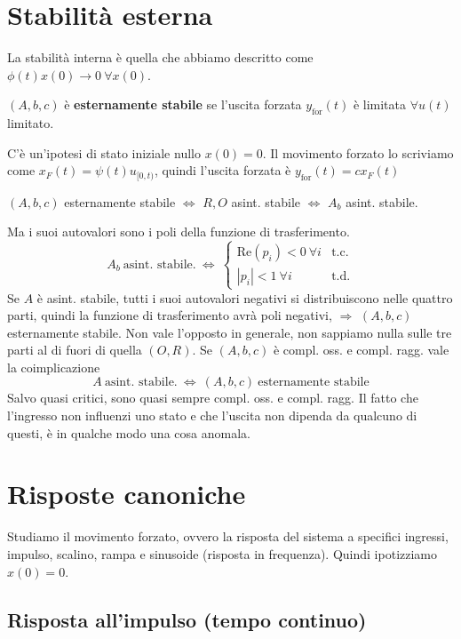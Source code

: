 \documentclass[10pt,a4paper]{book}
\begin{document}
\chapter{Stabilità esterna}

La stabilità interna è quella che abbiamo descritto come $\phi (t) x(0)\rightarrow 0\ \forall x(0)$.
\begin{definition}
$( A,b,c)$ è \textbf{esternamente stabile} se l'uscita forzata $y_{\text{for}}(t)$ è limitata $\forall u(t)$ limitato.
\end{definition}
C'è un'ipotesi di stato iniziale nullo $x(0) =0$. Il movimento forzato lo scriviamo come $x_F(t) =\psi (t) u_{[ 0,t)}$, quindi l'uscita forzata è $y_{\text{for}}(t) =cx_F(t)$
\begin{theorem}
$( A,b,c)$ esternamente stabile $\Leftrightarrow $ $R,O$ asint. stabile $\Leftrightarrow $ $A_b$ asint. stabile.
\end{theorem}
Ma i suoi autovalori sono i poli della funzione di trasferimento.
\begin{equation*}
A_b \ \text{asint. stabile.} \ \Leftrightarrow \ \begin{cases}
\mathrm{Re}( p_i) < 0\ \forall i & \text{t.c.}\\
| p_i| < 1\ \forall i & \text{t.d.}
\end{cases}
\end{equation*}
Se $A$ è asint. stabile, tutti i suoi autovalori negativi si distribuiscono nelle quattro parti, quindi la funzione di trasferimento avrà poli negativi, $\Rightarrow $ $( A,b,c)$ esternamente stabile. Non vale l'opposto in generale, non sappiamo nulla sulle tre parti al di fuori di quella $( O,R)$. Se $( A,b,c)$ è compl. oss. e compl. ragg. vale la coimplicazione
\begin{equation*}
A\ \text{asint. stabile.} \ \Leftrightarrow \ ( A,b,c) \ \text{esternamente stabile}
\end{equation*}
Salvo quasi critici, sono quasi sempre compl. oss. e compl. ragg. Il fatto che l'ingresso non influenzi uno stato e che l'uscita non dipenda da qualcuno di questi, è in qualche modo una cosa anomala.
\chapter{Risposte canoniche}

Studiamo il movimento forzato, ovvero la risposta del sistema a specifici ingressi, impulso, scalino, rampa e sinusoide (risposta in frequenza). Quindi ipotizziamo $x(0) =0$.
\section{Risposta all'impulso (tempo continuo)}
\end{document}
